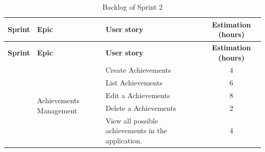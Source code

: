 \begin{longtable}{ | m{}  | m{} | m{} | c | }
    \caption{Backlog of Sprint 2}                                                                                                          \\
    \hline
    \textbf{Sprint}         & \textbf{Epic}                                        & \textbf{User story}          & \textbf{Estimation (hours)} \\
    \hline
    \endfirsthead
    \hline
    \textbf{Sprint}         & \textbf{Epic}                                        & \textbf{User story}          & \textbf{Estimation (hours)} \\
    \hline
    \endhead
    \hline
    \endfoot
    \endlastfoot
    \multirow[t]{2}{5em}{2} & \multirow{5}{5em}{Achievements Management} & Create Achievements            & 4                          \\
    \cline{3-4}
                            &                                                      & List Achievements               & 6                          \\
    \cline{3-4}
                            &                                                      & Edit a Achievements              & 8                           \\
    \cline{3-4}
                            &                                                      & Delete a Achievements            & 2                           \\
    \cline{3-4}                        &                  & View all possible achievements in the application. & 4                          \\
                    


\end{longtable}
